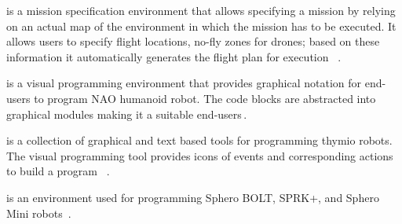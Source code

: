 \parhead{\flyaq} is a mission specification environment that allows specifying a mission by relying on an actual map of the environment in which the mission has to be executed. It allows users to specify  flight locations, no-fly zones for drones;  based on these information it automatically generates the flight plan for execution ~\cite{FLYAQ,DiRuscio2014,Bozhinoski2016}.%

\parhead{\tivipe} is a visual programming environment that provides graphical notation for end-users to program NAO humanoid robot. The code blocks are abstracted into graphical modules making it a suitable end-users\,\cite{TiViPE}.  %

\parhead{\aseba} is a collection of graphical and text based tools for programming thymio robots. The visual programming tool provides icons of events and corresponding actions to build a program ~\cite{ASEBA,Magnenat2011}. %

\parhead{\sphero} is an environment used for programming Sphero BOLT, SPRK+, and Sphero Mini robots~\cite{Sphero}. %

